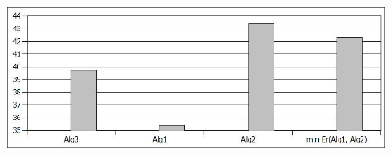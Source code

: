 \documentclass{article}
\begin{document}
\begin{figure}
	\centering
		\includegraphics[scale=0.4]{images/testF1.jpg}
	\caption{} %
	\label{fig:testFeatonly}
\end{figure}  
\end{document}
